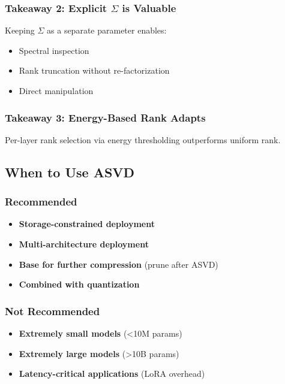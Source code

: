 \subsubsection{Takeaway 2: Explicit $\Sigma$ is Valuable}

Keeping $\Sigma$ as a separate parameter enables:
\begin{itemize}
\item Spectral inspection
\item Rank truncation without re-factorization
\item Direct manipulation

\end{itemize}
\subsubsection{Takeaway 3: Energy-Based Rank Adapts}

Per-layer rank selection via energy thresholding outperforms uniform rank.

\subsection{When to Use ASVD}

\subsubsection{Recommended}

\begin{itemize}
\item \textbf{Storage-constrained deployment}
\item \textbf{Multi-architecture deployment}
\item \textbf{Base for further compression} (prune after ASVD)
\item \textbf{Combined with quantization}

\end{itemize}
\subsubsection{Not Recommended}

\begin{itemize}
\item \textbf{Extremely small models} (<10M params)
\item \textbf{Extremely large models} (>10B params)
\item \textbf{Latency-critical applications} (LoRA overhead)

\end{itemize}
